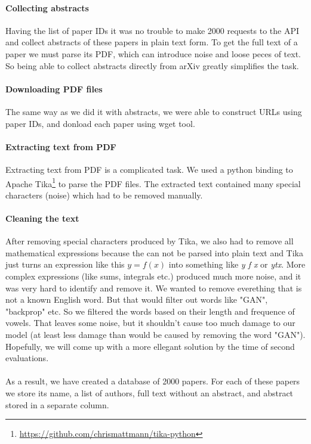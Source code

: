 \documentclass[sigplan]{acmart}
\begin{document}
\paragraph{Collecting abstracts} Having the list of paper IDs it was no trouble to make 2000 requests to the API and collect abstracts of these papers in plain text form. To get the full text of a paper we must parse its PDF, which can introduce noise and loose peces of text. So being able to collect abstracts directly from arXiv greatly simplifies the task.

\paragraph{Downloading PDF files} The same way as we did it with abstracts, we were able to construct URLs using paper IDs, and donload each paper using wget tool.

\paragraph{Extracting text from PDF} Extracting text from PDF is a complicated task. We used a python binding to Apache Tika\footnote{\url{https://github.com/chrismattmann/tika-python}} to parse the PDF files. The extracted text contained many special characters (noise) which had to be removed manually. 

\paragraph{Cleaning the text} After removing special characters produced by Tika, we also had to remove all mathematical expressions because the can not be parsed into plain text and Tika just turns an expression like this $y = f(x)$ into something like \textit{y f x} or \textit{ytx}. More complex expressions (like sums, integrals etc.) produced much more noise, and it was very hard to identify and remove it. We wanted to remove everething that is not a known English word. But that would filter out words like "GAN", "backprop" etc. So we filtered the words based on their length and frequence of vowels. That leaves some noise, but it shouldn't cause too much damage to our model (at least less damage than would be caused by removing the word "GAN"). Hopefully, we will come up with a more ellegant solution by the time of second evaluations.

\paragraph{} As a result, we have created a database of 2000 papers. For each of these papers we store its name, a list of authors, full text without an abstract, and abstract stored in a separate column. 
\end{document}
